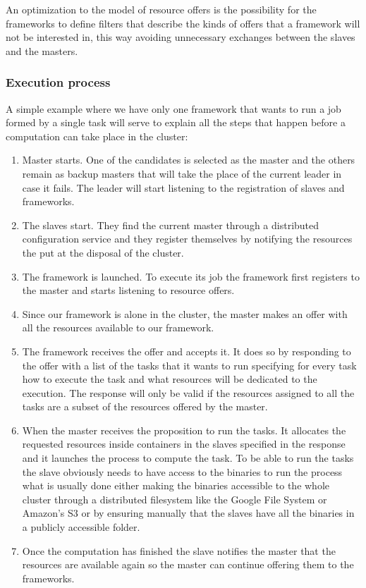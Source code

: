 \documentclass{article}                     %
\begin{document}
An optimization to the model of resource offers is the possibility for the frameworks
to define filters that describe the kinds of offers that a framework will not be interested
in, this way avoiding unnecessary exchanges between the slaves and the masters.

\subsubsection{Execution process}

A simple example where we have only one framework that wants to run a 
job formed by a single task will serve to explain all the steps that happen
before a computation can take place in the cluster:

\begin{enumerate}\itemsep4pt
\item Master starts. One of the candidates is selected as the master and 
the others remain as backup masters that will take the place of the current leader in
case it fails. The leader will start listening to the registration of slaves and 
frameworks.
\item The slaves start. They find the current master through a distributed configuration 
service and they register themselves by notifying the resources the put at the disposal
of the cluster.
\item The framework is launched. To execute its job the framework
  first registers to the master and starts listening to resource
  offers.
\item Since our framework is alone in the cluster, the master makes an offer with
all the resources available to our framework.
\item The framework receives the offer and accepts it. It does so by responding to the
offer with a list of the tasks that it wants to run specifying for every task how to 
execute the task and what resources will be dedicated to the execution.
The response will only be valid if the resources assigned to all the tasks are a subset
of the resources offered by the master.
\item When the master receives the proposition to run the tasks. It
  allocates the requested resources inside containers in the slaves
  specified in the response and it launches the process to compute the
  task. To be able to run the tasks the slave obviously needs to have
  access to the binaries to run the process what is usually done
  either making the binaries accessible to the whole cluster through a
  distributed filesystem like the Google File System
  \cite{ghemawat_google_2003} or Amazon's S3 \cite{_aws_????} or by
  ensuring manually that the slaves have all the binaries in a publicly
  accessible folder.
\item Once the computation has finished the slave notifies the master that the resources
are available again so the master can continue offering them to the frameworks.
\end{enumerate}
\end{document}

